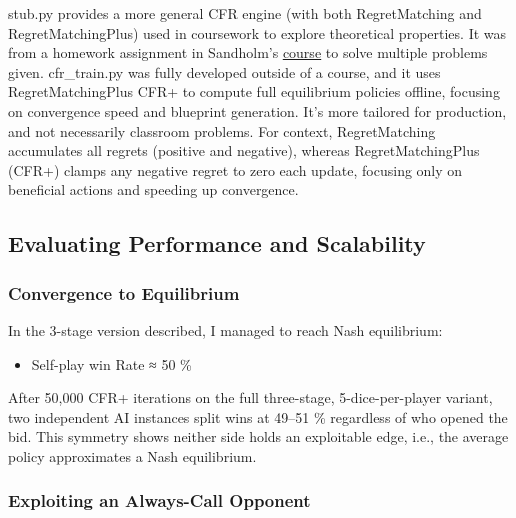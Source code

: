 \documentclass[
]{article}
\begin{document}
stub.py provides a more general CFR engine (with both RegretMatching and
RegretMatchingPlus) used in coursework to explore theoretical
properties. It was from a homework assignment in Sandholm's
\href{https://www.cs.cmu.edu/~sandholm/cs15-888F23/}{\ul{course}} to
solve multiple problems given. cfr\_train.py was fully developed outside
of a course, and it uses RegretMatchingPlus CFR+ to compute full
equilibrium policies offline, focusing on convergence speed and
blueprint generation. It's more tailored for production, and not
necessarily classroom problems. For context, RegretMatching accumulates
all regrets (positive and negative), whereas RegretMatchingPlus (CFR+)
clamps any negative regret to zero each update, focusing only on
beneficial actions and speeding up convergence.

\subsection{\texorpdfstring{\textbf{Evaluating Performance and
Scalability}}{Evaluating Performance and Scalability}}\label{evaluating-performance-and-scalability}

\subsubsection{\texorpdfstring{\textbf{Convergence to
Equilibrium}}{Convergence to Equilibrium}}\label{convergence-to-equilibrium}

In the 3-stage version described, I managed to reach Nash equilibrium:

\begin{itemize}
\item
  Self-play win Rate ≈ 50 \%
\end{itemize}

After 50,000 CFR+ iterations on the full three-stage, 5-dice-per-player
variant, two independent AI instances split wins at 49--51 \% regardless
of who opened the bid. This symmetry shows neither side holds an
exploitable edge, i.e., the average policy approximates a Nash
equilibrium.

\subsubsection{\texorpdfstring{\textbf{Exploiting an Always-Call
Opponent}}{Exploiting an Always-Call Opponent}}\label{exploiting-an-always-call-opponent}
\end{document}
